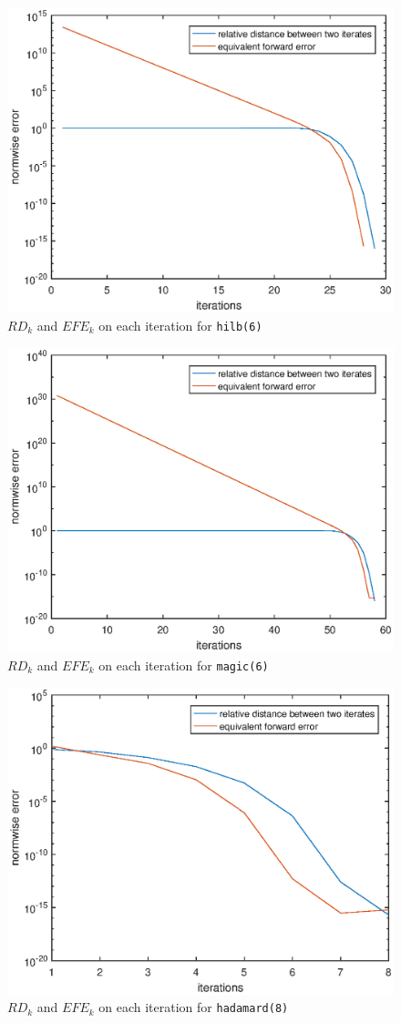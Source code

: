 \documentclass[12pt]{article}
\def\t#1{\texttt{\upshape #1}}
\begin{document}
\begin{figure}[h]
	\centering
	\caption{$RD_k$ and $EFE_k$ on each iteration for \t{hilb(6)}}
	\includegraphics[width=.7\textwidth]{hilb6.eps}
\end{figure}

\begin{figure}[h]
	\centering
	\caption{$RD_k$ and $EFE_k$ on each iteration for \t{magic(6)}}
	\includegraphics[width=.7\textwidth]{magic6.eps}
\end{figure}

\begin{figure}[h]
	\centering
	\caption{$RD_k$ and $EFE_k$ on each iteration for \t{hadamard(8)}}
	\includegraphics[width=.7\textwidth]{hadamard8.eps}
\end{figure}
\clearpage
\end{document}
